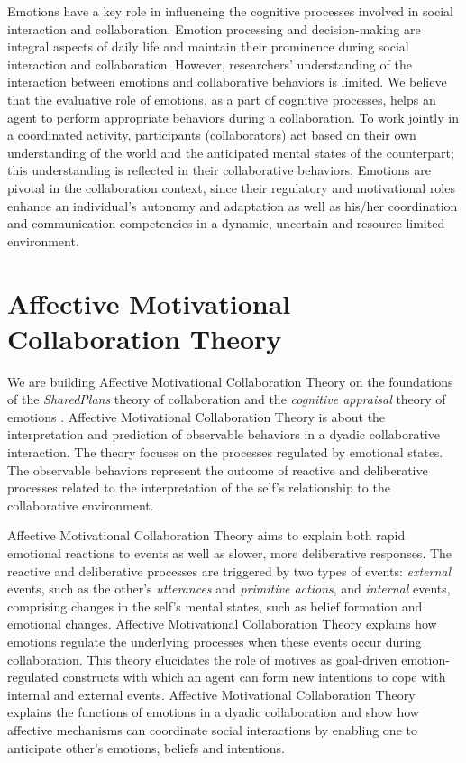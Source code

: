 \documentclass[letterpaper]{article}
\begin{document}
Emotions have a key role in influencing the cognitive processes involved in
social interaction and collaboration. Emotion processing and decision-making are
integral aspects of daily life and maintain their prominence during social
interaction and collaboration. However, researchers' understanding of the
interaction between emotions and collaborative behaviors is limited. We believe
that the evaluative role of emotions, as a part of cognitive processes, helps an
agent to perform appropriate behaviors during a collaboration. To work jointly
in a coordinated activity, participants (collaborators) act based on their own
understanding of the world and the anticipated mental states of the counterpart;
this understanding is reflected in their collaborative behaviors. Emotions are
pivotal in the collaboration context, since their regulatory and motivational
roles enhance an individual's autonomy and adaptation as well as his/her
coordination and communication competencies in a dynamic, uncertain and
resource-limited environment.

\section{Affective Motivational Collaboration Theory}

We are building Affective Motivational Collaboration Theory on the foundations
of the \textit{SharedPlans} theory of collaboration \cite{grosz:plans-discourse}
and the \textit{cognitive appraisal} theory of emotions
\cite{gratch:domain-independent}. Affective Motivational Collaboration Theory is
about the interpretation and prediction of observable behaviors in a dyadic
collaborative interaction. The theory focuses on the processes regulated by
emotional states. The observable behaviors represent the outcome of reactive and
deliberative processes related to the interpretation of the self's relationship
to the collaborative environment. 

Affective Motivational Collaboration Theory aims to explain both rapid emotional
reactions to events as well as slower, more deliberative responses. The reactive
and deliberative processes are triggered by two types of events:
\textit{external} events, such as the other's \textit{utterances} and
\textit{primitive actions}, and \textit{internal} events, comprising changes in
the self's mental states, such as belief formation and emotional changes.
Affective Motivational Collaboration Theory explains how emotions regulate the
underlying processes when these events occur during collaboration. This theory
elucidates the role of motives as goal-driven emotion-regulated constructs with
which an agent can form new intentions to cope with internal and external
events. Affective Motivational Collaboration Theory explains the functions of
emotions in a dyadic collaboration and show how affective mechanisms can
coordinate social interactions by enabling one to anticipate other's emotions,
beliefs and intentions.
\end{document}
